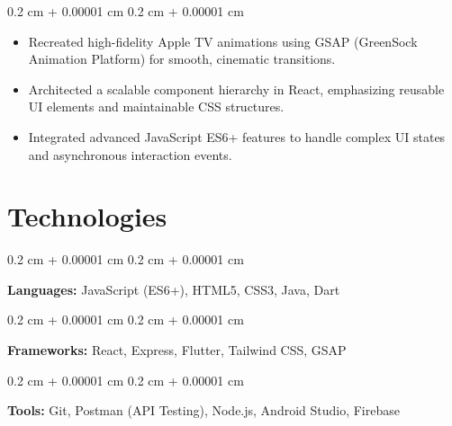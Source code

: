 \documentclass[10pt, a4paper]{article}
\newenvironment{highlights}{
    \begin{itemize}[
        topsep=0.10 cm,
        parsep=0.10 cm,
        partopsep=0pt,
        itemsep=0pt,
        leftmargin=0.4 cm + 10pt
    ]
}{
    \end{itemize}
} %
\newenvironment{onecolentry}{
    \begin{adjustwidth}{
        0.2 cm + 0.00001 cm
    }{
        0.2 cm + 0.00001 cm
    }
}{
    \end{adjustwidth}
} %
\begin{document}
    \vspace{0.10 cm}
    \begin{onecolentry}
    \begin{highlights}
        \item Recreated high-fidelity Apple TV animations using GSAP (GreenSock Animation Platform) for smooth, cinematic transitions.
\item Architected a scalable component hierarchy in React, emphasizing reusable UI elements and maintainable CSS structures.
\item Integrated advanced JavaScript ES6+ features to handle complex UI states and asynchronous interaction events.
    \end{highlights}
    \end{onecolentry}
    \vspace{0.2 cm}

    \section{Technologies}
    
            \begin{onecolentry}
                \textbf{Languages:} JavaScript (ES6+), HTML5, CSS3, Java, Dart
            \end{onecolentry}
            \vspace{0.1cm}
            \begin{onecolentry}
                \textbf{Frameworks:} React, Express, Flutter, Tailwind CSS, GSAP
            \end{onecolentry}
            \vspace{0.1 cm}
            \begin{onecolentry}
            \textbf{Tools:} Git, Postman (API Testing), Node.js, Android Studio, Firebase
            \end{onecolentry}
        
\end{document}
